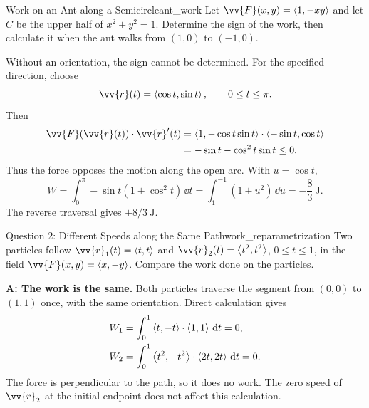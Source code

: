 \newpage
\begin{problem}{Work on an Ant along a Semicircle}{ant_work}
Let $\vv{F}(x,y) = \ang{1,-xy}$ and let $C$ be the upper half of $x^2 + y^2 = 1$. Determine the sign of the work, then calculate it when the ant walks from $(1,0)$ to $(-1,0)$.
\end{problem}
\begin{center}
\end{center}
\begin{sol}
Without an orientation, the sign cannot be determined. For the specified direction, choose
\[
    \vv{r}(t) = \ang{\cos t,\sin t},\qquad 0 \le t \le \pi.
\]
Then
\begin{align*}
    \vv{F}(\vv{r}(t))\cdot\vv{r}'(t)
    &= \ang{1,-\cos t\sin t}\cdot\ang{-\sin t,\cos t}\\
    &= -\sin t - \cos^2 t\sin t \le 0.
\end{align*}
Thus the force opposes the motion along the open arc. With $u = \cos t$,
\[
    W = \int_0^\pi -\sin t(1 + \cos^2 t)\,\dd{t}
    = \int_1^{-1}(1 + u^2)\,\dd{u}
    = \boxed{-\frac{8}{3}\ \mathrm{J}}.
\]
The reverse traversal gives $+8/3\ \mathrm{J}$.
\end{sol}

\newpage
\begin{problem}{Question 2: Different Speeds along the Same Path}{work_reparametrization}
Two particles follow $\vv{r}_1(t) = \ang{t,t}$ and $\vv{r}_2(t) = \ang{t^2,t^2}$, $0 \le t \le 1$, in the field $\vv{F}(x,y) = \ang{x,-y}$. Compare the work done on the particles.
\end{problem}
\begin{sol}
\textbf{A: The work is the same.} Both particles traverse the segment from $(0,0)$ to $(1,1)$ once, with the same orientation. Direct calculation gives
\begin{align*}
    W_1 &= \int_0^1\left\langle t,-t \right\rangle\cdot\left\langle 1,1 \right\rangle\,\mathrm{d}t = 0,\\
    W_2 &= \int_0^1\left\langle t^2,-t^2 \right\rangle\cdot\left\langle 2t,2t \right\rangle\,\mathrm{d}t = 0.
\end{align*}
The force is perpendicular to the path, so it does no work. The zero speed of $\vv{r}_2$ at the initial endpoint does not affect this calculation.
\end{sol}


